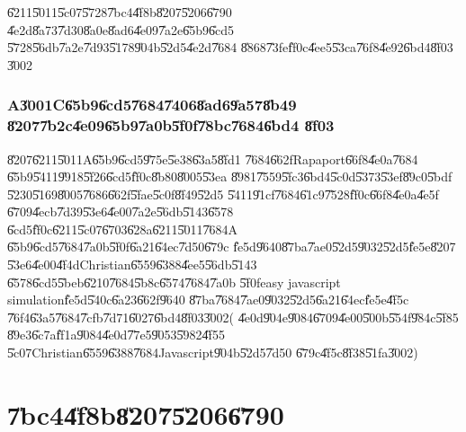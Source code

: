 \documentclass[12pt,a4paper]{article}
\begin{document}
\bigskip

\U{6211}\U{5011}\U{5c07}\U{5728}\U{7bc4}\U{4f8b}\U{8207}\U{5206}\U{6790}%
\U{4e2d}\U{8a73}\U{7d30}\U{8a0e}\U{8ad6}\U{4e09}\U{7a2e}\U{65b9}\U{6cd5}%
\U{5728}\U{56db}\U{7a2e}\U{7d93}\U{5178}\U{904b}\U{52d5}\U{4e2d}\U{7684}%
\U{8868}\U{73fe}\U{ff0c}\U{4ee5}\U{53ca}\U{76f8}\U{4e92}\U{6bd4}\U{8f03}%
\U{3002}

\section{A\U{3001}C\U{65b9}\U{6cd5}\U{7684}\U{7406}\U{8ad6}\U{9a57}\U{8b49}%
\U{8207}\U{7b2c}\U{4e09}\U{65b9}\U{7a0b}\U{5f0f}\U{78bc}\U{7684}\U{6bd4}%
\U{8f03}}

\U{8207}\U{6211}\U{5011}A\U{65b9}\U{6cd5}\U{975e}\U{5e38}\U{63a5}\U{8fd1}%
\U{7684}\U{662f}Rapaport\U{66f8}\U{4e0a}\cite[Page 232]{rapaport}\U{7684}%
\U{65b9}\U{5411}\U{9918}\U{5f26}\U{6cd5}\U{ff0c}\U{8b80}\U{8005}\U{53ea}%
\U{8981}\U{7559}\U{5fc3}\U{6bd4}\U{5c0d}\U{5373}\U{53ef}\U{89c0}\U{5bdf}%
\U{5230}\U{5169}\U{8005}\U{7686}\U{662f}\U{5fae}\U{5c0f}\U{8f49}\U{52d5}%
\U{5411}\U{91cf}\U{7684}\U{61c9}\U{7528}\U{ff0c}\U{66f8}\U{4e0a}\U{4e5f}%
\U{6709}\U{4ecb}\U{7d39}\U{53e6}\U{4e00}\U{7a2e}\U{56db}\U{5143}\U{6578}%
\U{6cd5}\U{ff0c}\U{6211}\U{5c07}\U{6703}\U{628a}\U{6211}\U{5011}\U{7684}A%
\U{65b9}\U{6cd5}\U{7684}\U{7a0b}\U{5f0f}\U{6a21}\U{64ec}\U{7d50}\U{679c}%
\U{fe5d}\U{9640}\U{87ba}\U{7ae0}\U{52d5}\U{9032}\U{52d5}\U{fe5e}\U{8207}%
\U{53e6}\U{4e00}\U{4f4d}Christian\U{6559}\U{6388}\U{4ee5}\U{56db}\U{5143}%
\U{6578}\U{6cd5}\U{5beb}\U{6210}\U{7684}\U{5b8c}\U{6574}\U{7684}\U{7a0b}%
\U{5f0f}easy javascript simulation\U{fe5d}\U{540c}\U{6a23}\U{662f}\U{9640}%
\U{87ba}\U{7684}\U{7ae0}\U{9032}\U{52d5}\U{6a21}\U{64ec}\U{fe5e}\U{4f5c}%
\U{76f4}\U{63a5}\U{7684}\U{7cfb}\U{7d71}\U{6027}\U{6bd4}\U{8f03}\U{3002}(%
\U{4e0d}\U{904e}\U{9084}\U{6709}\U{4e00}\U{500b}\U{554f}\U{984c}\U{5f85}%
\U{89e3}\U{6c7a}\U{ff1a}\U{9084}\U{4e0d}\U{77e5}\U{9053}\U{5982}\U{4f55}%
\U{5c07}Christian\U{6559}\U{6388}\U{7684}Javascript\U{904b}\U{52d5}\U{7d50}%
\U{679c}\U{4f5c}\U{8f38}\U{51fa}\U{3002})

%

\part{\U{7bc4}\U{4f8b}\U{8207}\U{5206}\U{6790}}
\end{document}
